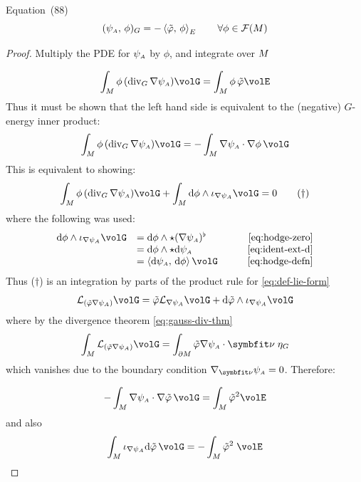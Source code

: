 \begin{proposition}
\label{prop:FA88}
\cite{armero2021modeling} Equation~(88)
\begin{equation}
(\psi_{\scriptscriptstyle{A}},\, \phi)_G = - \left<\tilde{\varphi},\, \phi\right>_E
\qquad \forall \phi \in \mathcal{F}(M)
\label{eq:FA88}
\end{equation}
\end{proposition}
\begin{proof}
Multiply the PDE for $\psi_{\scriptscriptstyle{A}}$ by $\phi$, and integrate over $M$

$$
\int_{\PlaneManifold} \phi \, (\operatorname{div}_{G}\nabla \WarpFA)  \volG 
= \int_{\PlaneManifold} \phi \, \WarpSV \volE
$$
Thus it must be shown that the left hand side is equivalent to the (negative) $G$-energy inner product:
$$
\int_{\PlaneManifold} \phi\, (\operatorname{div}_{G} \nabla \WarpFA) \volG
=- \int_{\PlaneManifold} \nabla \WarpFA \cdot \nabla \phi \, \volG 
$$
This is equivalent to showing:
\begin{equation}
\int_{\PlaneManifold} \phi\, (\operatorname{div}_{G} \nabla \WarpFA) \volG
+ \int_{\PlaneManifold} \dd \phi \wedge \interior{\nabla \WarpFA}{\volG} = 0
\tag{$\dagger$}
\end{equation}
where the following was used:
\[
\begin{array}{rlr}
\dd \phi \wedge \interior{\nabla \WarpFA}{\volG} 
&= \dd \phi \wedge \star (\nabla \WarpFA)^{\flat}  & \qquad \text{\eqref{eq:hodge-zero}}\\
&= \dd \phi \wedge \star     \dd \WarpFA &  \qquad \text{\eqref{eq:ident-ext-d}} \\
&= \left<\dd \WarpFA,\, \dd \phi \right> \volG & \qquad \text{\eqref{eq:hodge-defn}} \\
\end{array}
\]
Thus (\(\dagger\)) is an integration by parts of the product rule for \eqref{eq:def-lie-form}
\[
\mathcal{L}_{(\WarpSV \nabla \WarpFA)} \volG = \WarpSV \mathcal{L}_{\nabla \WarpFA}\volG + \dd \WarpSV \wedge \interior{\nabla \WarpFA}{\volG}
\]
where by the divergence theorem \eqref{eq:gauss-div-thm}
\[
\int_{\PlaneManifold} \mathcal{L}_{(\WarpSV \nabla \WarpFA)} \volG =
\int_{\PlaneBoundary} \WarpSV  \nabla \WarpFA \cdot \bm{\nu} \; \eta_G
\]
which vanishes due to the boundary condition \(\nabla_{\bm{\nu}} \WarpFA = 0\). 
Therefore:

$$
-\int_{\PlaneManifold} \nabla \WarpFA \cdot \nabla \WarpSV \, \volG
= \int_{\PlaneManifold} \WarpSV^2 \volE
$$
and also
$$
\int_{\PlaneManifold} \interior{\nabla\WarpFA}{\dd \WarpSV}\,\volG
=
- \int_{\PlaneManifold} \WarpSV^2 \; \volE
$$

\end{proof}
